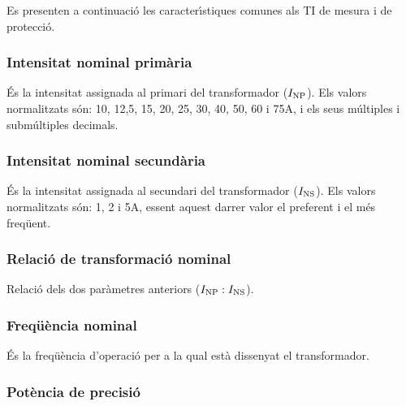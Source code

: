 Es presenten a continuaci\'{o} les caracter\'{\i}stiques comunes als TI de
mesura i de protecci\'{o}.

\subsubsection{Intensitat nominal prim\`{a}ria}

 \'{E}s la intensitat assignada al
primari del transformador ($I_\mathrm{NP}$).
Els valors normalitzats s\'{o}n: 10, 12,5, 15, 20, 25, 30, 40,
50, 60 i 75\unit{A}, i els seus m\'{u}ltiples i subm\'{u}ltiples decimals.

\subsubsection{Intensitat nominal secund\`{a}ria}

 \'{E}s la intensitat assignada al
secundari del transformador ($I_\mathrm{NS}$). Els valors normalitzats s\'{o}n:
1, 2 i 5\unit{A}, essent aquest darrer valor el preferent i el m\'{e}s freq\"{u}ent.

\subsubsection{Relaci\'{o} de transformaci\'{o} nominal}

Relaci\'{o} dels dos  par\`{a}metres anteriors ($I_\mathrm{NP}:I_\mathrm{NS}$).

\subsubsection{Freq\"{u}\`{e}ncia nominal}

 \'{E}s la freq\"{u}\`{e}ncia d'operaci\'{o} per a la qual    est\`{a} dissenyat el transformador.

\subsubsection{Pot\`{e}ncia de precisi\'{o}}

